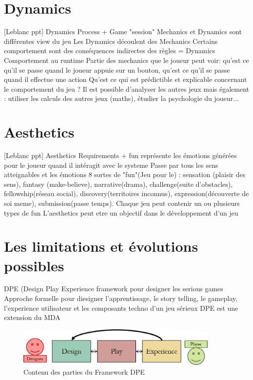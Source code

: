 \section{Dynamics}
[Leblanc ppt] Dynamics Process + Game "session"
Mechanics et Dynamics sont différentes view du jeu
Les Dynamics découlent des Mechanics
Certains comportement sont des conséquences indirectes des règles = Dynamics
Comportement au runtime
Partie des mechanics que le joueur peut voir: qu'est ce qu'il se passe quand le joueur appuie sur un bouton, qu'est ce qu'il se passe quand il effectue une action 
Qu'est ce qui est prédictible et explicable concernant le comportement du jeu ?
Il est possible d'analyser les autres jeux mais également : utiliser les calculs des autres jeux (maths), étudier la psychologie du joueur...


\section{Aesthetics}
[Leblanc ppt] Aesthetics Requirements + fun
représente les émotions générées pour le joueur quand il intéragit avec le systeme
Passe par tous les sens atteignables et les émotions
8 sortes de "fun"(Jeu pour le) : sensation (plaisir des sens), fantasy (make-believe), narrative(drama), challenge(suite d'obstacles), fellowship(réseau social), discovery(territoires inconnus), expression(découverte de soi meme), submission(passe temps).
Chaque jeu peut contenir un ou plusieurs types de fun
L'aesthetics peut etre un objectif dans le développement d'un jeu

\section{Les limitations et évolutions possibles}
DPE (Design Play Experience framework pour designer les serious games
Approche formelle pour diesigner l'apprentissage, le story telling, le gameplay, l'experience utilisateur et les composants techno d'un jeu sérieux
DPE est une extension du MDA

\begin{figure}[H]
    \centering
    \includegraphics[width=10cm]{10_img/chap3/dpe.png} 
    \caption{Contenu des parties du Framework DPE \cite{Winn2011}}
\end{figure}


